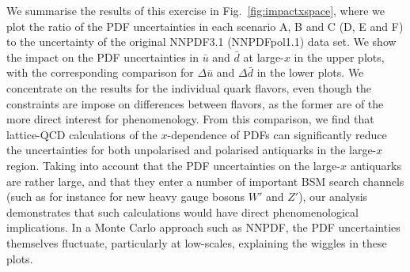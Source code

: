 We summarise the results of this exercise in Fig.~\ref{fig:impactxspace}, 
where we plot the ratio of the PDF uncertainties in each scenario A, B and C 
(D, E and F) to the uncertainty of the original
NNPDF3.1 (NNPDFpol1.1) data set.
%
We show the impact on the PDF uncertainties
in $\bar{u}$ and $\bar{d}$ at large-$x$ in the upper
plots, with the corresponding comparison for $\Delta\bar{u}$
and $\Delta\bar{d}$ in the lower plots.
%
We concentrate on the results for the individual quark flavors, even though 
the constraints are impose on differences between flavors, as the former are 
of the more direct interest for phenomenology. 
From this comparison, we find that lattice-QCD calculations of the 
$x$-dependence of PDFs can significantly reduce the uncertainties for both 
unpolarised and polarised antiquarks in the large-$x$ region.
%
Taking into account that the PDF uncertainties on the large-$x$
antiquarks are rather large, and that they
enter a number of important BSM search channels
(such as for instance for new heavy gauge bosons $W'$ and $Z'$),
our analysis demonstrates that such calculations would have direct
phenomenological implications.
%
In a Monte Carlo approach such as NNPDF, the
PDF uncertainties themselves fluctuate, particularly at low-scales,
explaining the wiggles in these plots.

